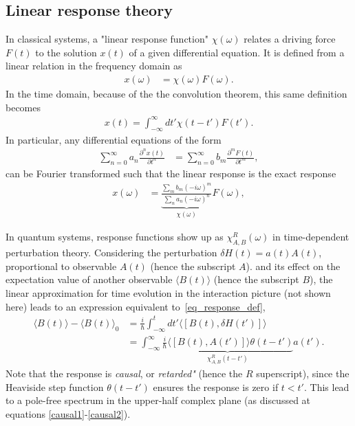 \documentclass[notitlepage,11pt,nofootinbib]{revtex4-1}
\begin{document}
\subsection{Linear response theory}
In classical systems, a "linear response function" $\chi(\omega)$ relates a driving force $F(t)$ to the solution $x(t)$ of a given differential equation. It is defined from a linear relation in the frequency domain as
\begin{align}
x(\omega)
&= \chi(\omega) F(\omega).
\label{eq_response_freq_def}
\end{align}
In the time domain, because of the the convolution theorem, this same definition becomes
\begin{align} 
x(t) = \int_{-\infty}^{\infty}dt' \chi(t-t') F(t').
\label{eq_response_def}
\end{align}
In particular, any differential equations of the form
\begin{align}
\sum_{n=0}^{\infty} a_n \frac{\partial^n x(t)}{\partial t^n}
&= 
\sum_{n=0}^{\infty} b_m \frac{\partial^m F(t)}{\partial t^m},
\end{align}
can be Fourier transformed such that the linear response is the exact response
\begin{align}
x(\omega) &= \underbrace{\frac{\sum_{m} b_m (-i\omega)^m}{\sum_{n} a_n (-i\omega)^n}}_{\chi(\omega)} F(\omega),
\end{align}

In quantum systems, response functions show up as $\chi^{R}_{A,B}(\omega)$ in time-dependent perturbation theory. Considering the perturbation $\delta H(t) = a(t) A(t)$, proportional to observable $A(t)$ (hence the subscript $A$). and its effect on the expectation value of another observable $\langle B(t) \rangle$ (hence the subscript $B$), the linear approximation for time evolution in the interaction picture (not shown here) leads to an expression equivalent to~\eqref{eq_response_def},
\begin{align}
    \langle B(t) \rangle - \langle B(t) \rangle_0 
    &=
    \frac{i}{\hbar} 
    \int_{-\infty}^{t} dt'
    \langle [B(t), \delta H(t')] \rangle
    \\&=
    \int_{-\infty}^{\infty}
    \underbrace{ 
    \frac{i}{\hbar} 
    \langle [B(t), A(t')] \rangle 
    \theta(t-t')
    }_{\chi^{R}_{A,B}(t-t')}
    a(t').
\end{align}
Note that the response is \emph{causal}, or \emph{retarded"} (hence the $R$ superscript), since the Heaviside step function $\theta(t-t')$ ensures the response is zero if $t<t'$. This lead to a pole-free spectrum in the upper-half complex plane (as discussed at equations \eqref{causal1}-\eqref{causal2}).
\end{document}
